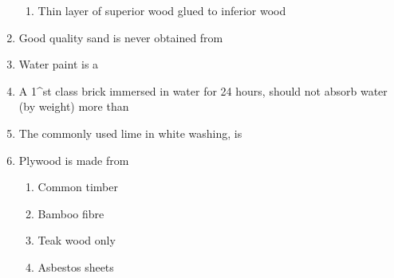 \documentclass[11pt,a4paper]{article}
\begin{document}
\begin{enumerate}
\begin{enumerate}[label=\Alph*.]
\item{Thin layer of superior wood glued to inferior wood}
\end{enumerate}
\item{Good quality sand is never obtained from}
\\
\item{Water paint is a}
\\
\item{A 1\^{}st class brick immersed in water for 24 hours, should not absorb water (by weight) more than}
\\
\item{The commonly used lime in white washing, is}
\\
\item{Plywood is made from}
\begin{enumerate}[label=\Alph*.]
\item{Common timber}
\item{Bamboo fibre}
\item{Teak wood only}
\item{Asbestos sheets}
\end{enumerate}

\end{enumerate}
\end{document}
